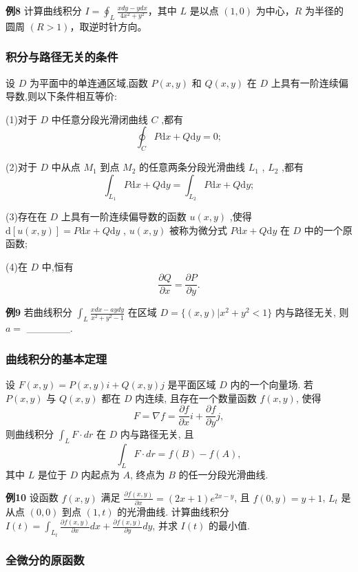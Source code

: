 \textbf{例8} 计算曲线积分 \(I = \oint_{L} \frac{xdy - ydx}{4x^2 + y^2}\)，其中 \(L\) 是以点 \((1,0)\) 为中心，\(R\) 为半径的圆周 \((R > 1)\)，取逆时针方向。


\subsubsection*{积分与路径无关的条件}


设 \(D\) 为平面中的单连通区域,函数 \(P(x,y)\) 和 \(Q(x,y)\) 在 \(D\) 上具有一阶连续偏导数,则以下条件相互等价:

(1)对于 \(D\) 中任意分段光滑闭曲线 \(C\) ,都有
\[\oint_{C}P\mathrm{d}x + Q\mathrm{d}y = 0;\]

(2)对于 \(D\) 中从点 \(M_{1}\) 到点 \(M_{2}\) 的任意两条分段光滑曲线 \(L_{1}\) , \(L_{2}\) ,都有
\[\int_{L_{1}}P\mathrm{d}x + Q\mathrm{d}y = \int_{L_{2}}P\mathrm{d}x + Q\mathrm{d}y;\]

(3)存在在 \(D\) 上具有一阶连续偏导数的函数 \(u(x,y)\) ,使得 \(\mathrm{d}[u(x,y)] = P\mathrm{d}x + Q\mathrm{d}y\) , \(u(x,y)\) 被称为微分式 \(P\mathrm{d}x + Q\mathrm{d}y\) 在 \(D\) 中的一个原函数;

(4)在 \(D\) 中,恒有
\[\frac{\partial Q}{\partial x} = \frac{\partial P}{\partial y}.\]

\textbf{例9} 若曲线积分 \(\int_{L} \frac{xdx - aydy}{x^2 + y^2 - 1}\) 在区域 \(D = \{(x, y) | x^2 + y^2 < 1\}\) 内与路径无关, 则 \(a =\) ______.


\subsubsection*{曲线积分的基本定理}


设 \(F(x,y) = P(x,y)i + Q(x,y)j\) 是平面区域 \(D\) 内的一个向量场. 若 \(P(x,y)\) 与 \(Q(x,y)\) 都在 \(D\) 内连续, 且存在一个数量函数 \(f(x,y)\), 使得
\[F = \nabla f = \frac{\partial f}{\partial x}i + \frac{\partial f}{\partial y}j,\]
则曲线积分 \(\int_L F \cdot dr\) 在 \(D\) 内与路径无关, 且
\[\int_L F \cdot dr = f(B) - f(A),\]
其中 \(L\) 是位于 \(D\) 内起点为 \(A\), 终点为 \(B\) 的任一分段光滑曲线.

\textbf{例10}
设函数 \(f(x,y)\) 满足 \(\frac{\partial f(x,y)}{\partial x} = (2x+1)e^{2x-y}\), 且 \(f(0,y) = y+1\), \(L_t\) 是从点 \((0,0)\) 到点 \((1,t)\) 的光滑曲线. 计算曲线积分 \(I(t) = \int_{L_t} \frac{\partial f(x,y)}{\partial x} dx + \frac{\partial f(x,y)}{\partial y} dy\), 并求 \(I(t)\) 的最小值.


\subsubsection*{全微分的原函数}


